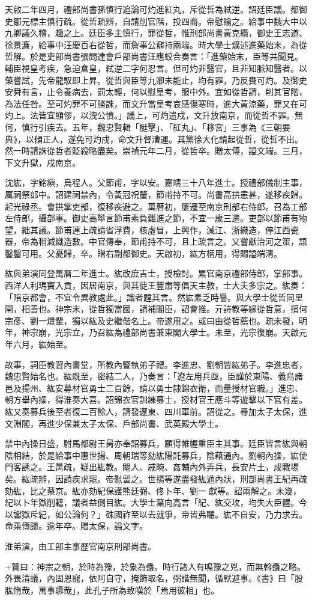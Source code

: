 \begin{pinyinscope}
天啟二年四月，禮部尚書孫慎行追論可灼進紅丸，斥從哲為弒逆。詔廷臣議。都御史鄒元標主慎行疏。從哲疏辨，自請削官階，投四裔。帝慰諭之。給事中魏大中以九卿議久稽，趣之上。廷臣多主慎行，罪從哲，惟刑部尚書黃克纘，御史王志道、徐景濂，給事中汪慶百右從哲，而詹事公鼐持兩端。時大學士爌述進藥始末，為從哲解。於是吏部尚書張問達會戶部尚書汪應蛟合奏言：「進藥始末，臣等共聞見。輔臣視皇考疾，急迫倉皇，弒逆二字何忍言。但可灼非醫官，且非知脈知醫者。以藥嘗試，先帝龍馭即上昇。從哲與臣等九卿未能止，均有罪，乃反賚可灼。及御史安舜有言，止令養病去，罰太輕，何以慰皇考，服中外。宜如從哲請，削其官階，為法任咎。至可灼罪不可勝誅，而文升當皇考哀感傷寒時，進大黃涼藥，罪又在可灼上。法皆宜顯僇，以洩公憤。」議上，可灼遣戍，文升放南京，而從哲不罪。無何，慎行引疾去。五年，魏忠賢輯「梃擊」、「紅丸」、「移宮」三事為《三朝要典》，以傾正人，遂免可灼戍，命文升督漕運。其黨徐大化請起從哲，從哲不出。然一時請誅從哲者貶殺略盡矣。崇禎元年二月，從哲卒。贈太傅，謚文端。三月，下文升獄，戍南京。

沈紘，字銘縝，烏程人。父節甫，字以安。嘉靖三十八年進士。授禮部儀制主事，厲祠祭郎中。詔建祠禁內，令黃冠祝釐，節甫持不可。尚書高拱恚甚，遂移疾歸。起光祿丞。會拱掌吏部，復移疾避之。萬曆初，屢遷至南京刑部右侍郎。召為工部左侍郎，攝部事。御史高舉言節甫素負難進之節，不宜一歲三遷。吏部以節甫有物望，絀其議。節甫連上疏請省浮費，核虛冒，上興作，減江、浙織造，停江西瓷器，帝為稍減織造數。中官傳奉，節甫持不可，且上疏言之。又嘗獻治河之策，語鑿鑿可用。父憂歸，卒。贈右副都御史。天啟初，紘方柄用，得賜謚端清。

紘與弟演同登萬曆二年進士。紘改庶吉士，授檢討。累官南京禮部侍郎，掌部事。西洋人利瑪竇入貢，因居南京，與其徒王豐肅等倡天主教，士大夫多宗之。紘奏：「陪京都會，不宜令異教處此。」識者韙其言。然紘素乏時譽。與大學士從哲同里閈，相善也。神宗末，從哲獨當國，請補閣臣，詔會推。亓詩教等緣從哲意，擯何宗彥、劉一燝輩，獨以紘及史繼偕名上。帝遂用之。或曰由從哲薦也。疏未發，明年，神宗崩，光宗立，乃召紘為禮部尚書兼東閣大學士。未至，光宗復崩。天啟元年六月，紘始至。

故事，詞臣教習內書堂，所教內豎執弟子禮。李進忠、劉朝皆紘弟子。李進忠者，魏忠賢始名也。紘既至，密結二人，乃奏言：「遼左用兵亟，臣謹於東陽、義烏諸邑及揚州、紘安募材官勇士二百餘，請以勇士隸錦衣衛，而量授材官職。」進忠、朝方舉內操，得淮奏大喜。詔錦衣官訓練募士，授材官王應斗等遊擊以下官有差。紘又奏募兵後至者復二百餘人，請發遼東、四川軍前。詔從之。尋加太子太保，進文淵閣，再進少保兼太子太保、戶部尚書、武英殿大學士。

禁中內操日盛，駙馬都尉王昺亦奉詔募兵，願得帷幄重臣主其事。廷臣皆言紘與朝陰相結，於是給事中惠世揚、周朝瑞等劾紘陽託募兵，陰藉通內。劉朝內操，紘使門客誘之。王昺疏，疑出紘教。閹人、戚畹、姦輔內外弄兵，長安片土，成戰場矣。紘疏辨，因請疾求罷。帝慰留之。世揚等遂盡發紘通內狀，刑部尚書王紀再疏劾紘，比之蔡京。紘亦劾紀保護熊廷弼、佟卜年、劉一獻等。詔兩解之。未幾，紀以卜年獄削籍，議者益側目紘。大學士葉向高言「紀、紘交攻，均失大臣體。今以讞獄斥紀，如公論何？」硃國祚至以去就爭，帝皆弗聽。紘不自安，乃力求去。命乘傳歸。逾年卒。贈太保，謚文字。

淮弟演，由工部主事歷官南京刑部尚書。

+贊曰：神宗之朝，於時為豫，於象為蠱。時行諸人有鳴豫之兇，而無斡蠱之略。外畏清議，內固恩寵，依阿自守，掩飾取名，弼諧無聞，循默避事。《書》曰「股肱惰哉，萬事隳哉」，此孔子所為致嘆於「焉用彼相」也。


\end{pinyinscope}